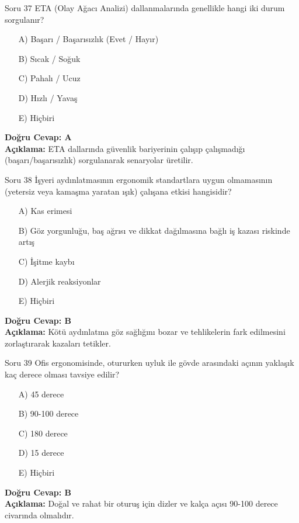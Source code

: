 \documentclass[12pt,a4paper]{article}
\begin{document}
\begin{testcard}{Soru 37}
    ETA (Olay Ağacı Analizi) dallanmalarında genellikle hangi iki durum sorgulanır?
    \begin{itemize}
        \item[A)] Başarı / Başarısızlık (Evet / Hayır)
        \item[B)] Sıcak / Soğuk
        \item[C)] Pahalı / Ucuz
        \item[D)] Hızlı / Yavaş
        \item[E)] Hiçbiri
    \end{itemize}
    \tcblower
    \textbf{Doğru Cevap: A} \\
    \textbf{Açıklama:} ETA dallarında güvenlik bariyerinin çalışıp çalışmadığı (başarı/başarısızlık) sorgulanarak senaryolar üretilir.
\end{testcard}

\begin{testcard}{Soru 38}
    İşyeri aydınlatmasının ergonomik standartlara uygun olmamasının (yetersiz veya kamaşma yaratan ışık) çalışana etkisi hangisidir?
    \begin{itemize}
        \item[A)] Kas erimesi
        \item[B)] Göz yorgunluğu, baş ağrısı ve dikkat dağılmasına bağlı iş kazası riskinde artış
        \item[C)] İşitme kaybı
        \item[D)] Alerjik reaksiyonlar
        \item[E)] Hiçbiri
    \end{itemize}
    \tcblower
    \textbf{Doğru Cevap: B} \\
    \textbf{Açıklama:} Kötü aydınlatma göz sağlığını bozar ve tehlikelerin fark edilmesini zorlaştırarak kazaları tetikler.
\end{testcard}

\begin{testcard}{Soru 39}
    Ofis ergonomisinde, otururken uyluk ile gövde arasındaki açının yaklaşık kaç derece olması tavsiye edilir?
    \begin{itemize}
        \item[A)] 45 derece
        \item[B)] 90-100 derece
        \item[C)] 180 derece
        \item[D)] 15 derece
        \item[E)] Hiçbiri
    \end{itemize}
    \tcblower
    \textbf{Doğru Cevap: B} \\
    \textbf{Açıklama:} Doğal ve rahat bir oturuş için dizler ve kalça açısı 90-100 derece civarında olmalıdır.
\end{testcard}
\end{document}
